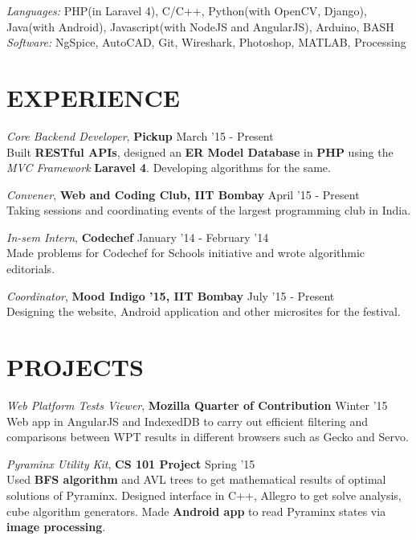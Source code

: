 \documentclass[margin, 10pt]{res} %
\begin{document}
\begin{resume}
{\sl Languages:} PHP(in Laravel 4), C/C++, Python(with OpenCV, Django), Java(with Android), Javascript(with NodeJS and AngularJS), Arduino, BASH\\
{\sl Software:} NgSpice, AutoCAD, Git, Wireshark, Photoshop, MATLAB, Processing
 
 
 
\section{EXPERIENCE}

{\sl Core Backend Developer}, \textbf{Pickup} \hfill March '15 - Present\\
Built \textbf {RESTful APIs}, designed an \textbf {ER Model Database} in \textbf {PHP} using the \textit {MVC Framework} \textbf{Laravel 4}. Developing algorithms for the same.

 
{\sl Convener}, \textbf{Web and Coding Club, IIT Bombay} \hfill April '15 - Present \\
Taking sessions and coordinating events of the largest programming club in India.

{\sl In-sem Intern}, \textbf{Codechef} \hfill January '14 - February '14 \\
Made problems for Codechef for Schools initiative and wrote algorithmic editorials.

{\sl Coordinator}, \textbf{Mood Indigo '15, IIT Bombay} \hfill July '15 - Present \\
Designing the website, Android application and other microsites for the festival.


\section{PROJECTS}

{\sl Web Platform Tests Viewer}, \textbf{Mozilla Quarter of Contribution} \hfill Winter '15 \\
Web app in AngularJS and IndexedDB to carry out efficient filtering and comparisons between WPT results in different browsers such as Gecko and Servo.

{\sl Pyraminx Utility Kit}, \textbf{CS 101 Project} \hfill Spring '15 \\
Used \textbf{BFS algorithm} and AVL trees to get mathematical results of optimal solutions of Pyraminx. Designed interface in C++, Allegro to get solve analysis, cube algorithm generators. Made \textbf{Android app} to read Pyraminx states via \textbf{image processing}.


\end{resume}
\end{document}
